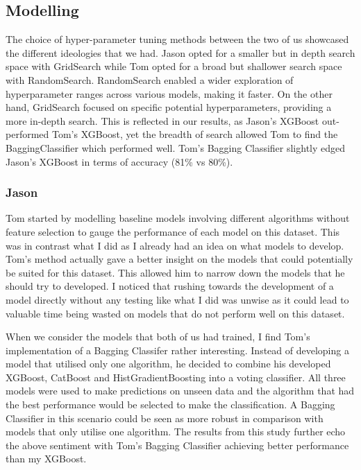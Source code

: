\documentclass[conference]{IEEEtran}
\begin{document}
\subsection{Modelling}

The choice of hyper-parameter tuning methods between the two of us showcased the different ideologies that we had. Jason opted for a smaller but in depth search space with GridSearch while Tom opted for a broad but shallower search space with RandomSearch. RandomSearch enabled a wider exploration of hyperparameter ranges across various models, making it faster. On the other hand, GridSearch focused on specific potential hyperparameters, providing a more in-depth search. This is reflected in our results, as Jason's XGBoost out-performed Tom's XGBoost, yet the breadth of search allowed Tom to find the BaggingClassifier which performed well. Tom's Bagging Classifier slightly edged Jason's XGBoost in terms of accuracy (81\% vs 80\%).


\subsubsection{Jason}

Tom started by modelling baseline models involving different algorithms without feature selection to gauge the performance of each model on this dataset. This was in contrast what I did as I already had an idea on what models to develop. Tom's method actually gave a better insight on the models that could potentially be suited for this dataset. This allowed him to narrow down the models that he should try to developed. I noticed that rushing towards the development of a model directly without any testing like what I did was unwise as it could lead to valuable time being wasted on models that do not perform well on this dataset.

When we consider the models that both of us had trained, I find Tom's implementation of a Bagging Classifer rather interesting. Instead of developing a model that utilised only one algorithm, he decided to combine his developed XGBoost, CatBoost and HistGradientBoosting into a voting classifier. All three models were used to make predictions on unseen data and the algorithm that had the best performance would be selected to make the classification. A Bagging Classifier in this scenario could be seen as more robust in comparison with models that only  utilise one algorithm. The results from this study further echo the above sentiment with Tom's Bagging Classifier achieving better performance than my XGBoost.
\end{document}
